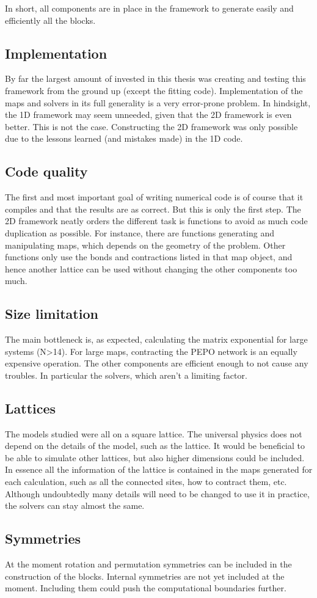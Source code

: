 
In short, all components are in place in the framework to generate easily and efficiently all the blocks.

\subsection{Implementation}

By far the largest amount of invested in this thesis was creating and testing this framework from the ground up (except the fitting code). Implementation of the maps and solvers in its full generality is a very error-prone problem. In hindsight, the 1D framework may seem unneeded, given that the 2D framework is even better. This is not the case. Constructing the 2D framework was only possible due to the lessons learned (and mistakes made) in the 1D code.

\subsection{Code quality}
The first and most important goal of writing numerical code is of course that it compiles and that the results are as correct. But this is only the first step. The 2D framework neatly orders the different task is functions to avoid as much code duplication as possible. For instance, there are functions generating and manipulating maps, which depends on the geometry of the problem. Other functions only use the bonds and contractions listed in that map object, and hence another lattice can be used without changing the other components too much.

\subsection{Size limitation}
The main bottleneck is, as expected, calculating the matrix exponential for large systems (N>14). For large maps, contracting the PEPO network is an equally expensive operation. The other components are efficient enough to not cause any troubles. In particular the solvers, which aren't a limiting factor.

\subsection{Lattices}
The models studied were all on a square lattice. The universal physics does not depend on the details of the model, such as the lattice. It would be beneficial to be able to simulate other lattices, but also higher dimensions could be included. In essence all the information of the lattice is contained in the maps generated for each calculation, such as all the connected sites, how to contract them, etc. Although undoubtedly many details will need to be changed to use it in practice, the solvers can stay almost the same.

\subsection{Symmetries}

At the moment rotation and permutation symmetries can be included in the construction of the blocks. Internal symmetries are not yet included at the moment. Including them could push the computational boundaries further.
